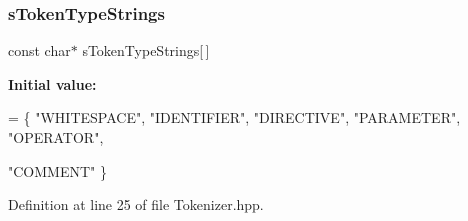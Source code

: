 \mbox{\label{namespaceft_a1b9b00bc284da71346729142b8560e03}} 
\subsubsection{\texorpdfstring{s\+Token\+Type\+Strings}{sTokenTypeStrings}}
{\footnotesize\ttfamily const char$\ast$ s\+Token\+Type\+Strings\mbox{[}$\,$\mbox{]}\hspace{0.3cm}{\ttfamily [static]}}

{\bfseries Initial value\+:}
\begin{DoxyCode}
= \{
        \textcolor{stringliteral}{"WHITESPACE"},
        \textcolor{stringliteral}{"IDENTIFIER"},
        \textcolor{stringliteral}{"DIRECTIVE"},
        \textcolor{stringliteral}{"PARAMETER"},
        \textcolor{stringliteral}{"OPERATOR"},
        
        \textcolor{stringliteral}{"COMMENT"}
    \}
\end{DoxyCode}


Definition at line 25 of file Tokenizer.\+hpp.

